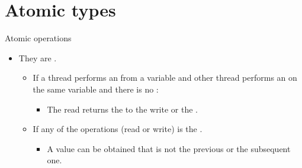 \section{Atomic types}

\begin{frame}[t]{Atomic operations}
\begin{itemize}
\item They are .
    \begin{itemize}

      \item If a thread performs an  from a variable and  
            other thread performs an  on the same variable and there is no
            :
        \begin{itemize}
          \item The read returns the  to the write or the .
        \end{itemize}

      \item If any of the operations (read or write) is  
            the .
        \begin{itemize}
          \item A value can be obtained that is not the previous or the subsequent one.
        \end{itemize}
    \end{itemize}
\end{itemize}
\end{frame}

